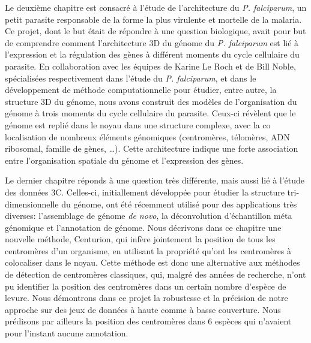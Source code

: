 \begin{resumes}
Le deuxième chapitre est consacré à l'étude de l'architecture du {\em P.
falciparum}, un petit parasite responsable de la forme la plus virulente et
mortelle de la malaria. Ce projet, dont le but était de répondre à une
question biologique, avait pour but de comprendre comment l'architecture 3D du
génome du {\em P. falciparum} est lié à l'expression et la régulation des
gènes à différent moments du cycle cellulaire du parasite. En collaboration
avec les équipes de Karine Le Roch et de Bill Noble, spécialisées
respectivement dans l'étude du {\em P. falciparum}, et dans le développement
de méthode computationnelle pour étudier, entre autre, la structure 3D du
génome, nous avons construit des modèles de l'organisation du génome à trois
moments du cycle cellulaire du parasite. Ceux-ci révèlent que le génome est
replié dans le noyau dans une structure complexe, avec la co localisation de
nombreux éléments génomiques (centromères, télomères, ADN ribosomal, famille
de gènes, \dots). Cette architecture indique une forte association entre
l'organisation spatiale du génome et l'expression des gènes.

Le dernier chapitre réponds à une question très différente, mais aussi lié à
l'étude des données 3C. Celles-ci, initiallement développée pour étudier la
structure tri-dimensionnelle du génome, ont été récemment utilisé pour des
applications très diverses: l'assemblage de génome {\em de novo}, la
déconvolution d'échantillon méta génomique et l'annotation de génome. Nous
décrivons dans ce chapitre une nouvelle méthode, Centurion, qui infère
jointement la position de tous les centromères d'un organisme, en utilisant la
propriété qu'ont les centromères à colocaliser dans le noyau. Cette méthode
est donc une alternative aux méthodes de détection de centromères classiques,
qui, malgré des années de recherche, n'ont pu identifier la position des
centromères dans un certain nombre d'espèce de levure. Nous démontrons dans ce
projet la robustesse et la précision de notre approche sur des jeux de données
à haute comme à basse couverture. Nous prédisons par ailleurs la position des
centromères dans 6 espèces qui n'avaient pour l'instant aucune annotation.


\end{resumes}
